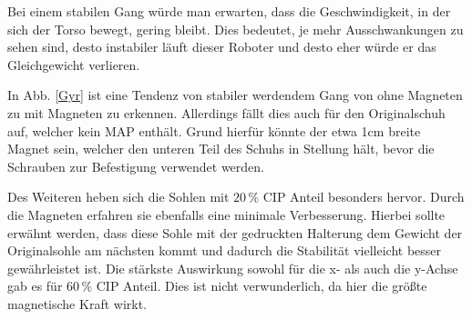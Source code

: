 
Bei einem stabilen Gang würde man erwarten, dass die Geschwindigkeit, in der sich der Torso bewegt, gering bleibt. Dies bedeutet, je mehr Ausschwankungen zu sehen sind, desto instabiler läuft dieser Roboter und desto eher würde er das Gleichgewicht verlieren. 

In Abb. \ref{Gyr} ist eine Tendenz von stabiler werdendem Gang von ohne Magneten zu mit Magneten zu erkennen. Allerdings fällt dies auch für den Originalschuh auf, welcher kein MAP enthält. Grund hierfür könnte der etwa 1cm breite Magnet sein, welcher den unteren Teil des Schuhs in Stellung hält, bevor die Schrauben zur Befestigung verwendet werden.

Des Weiteren heben sich die Sohlen mit $20\,\%$ CIP Anteil besonders hervor. Durch die Magneten erfahren sie ebenfalls eine minimale Verbesserung. Hierbei sollte erwähnt werden, dass diese Sohle mit der gedruckten Halterung dem Gewicht der Originalsohle am nächsten kommt und dadurch die Stabilität vielleicht besser gewährleistet ist. Die stärkste Auswirkung sowohl für die x- als auch die y-Achse gab es für $60\,\%$ CIP Anteil. Dies ist nicht verwunderlich, da hier die größte magnetische Kraft wirkt. 

